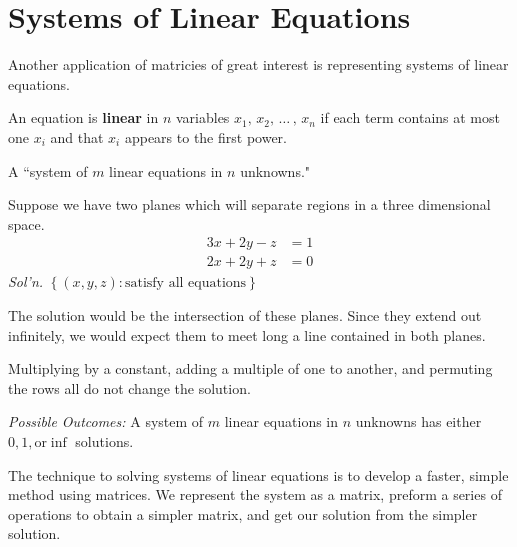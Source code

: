 \documentclass[../main.tex]{subfiles}
\begin{document}

\section{Systems of Linear Equations}

Another application of matricies of great interest is representing systems of linear equations.

\begin{definition}
    An equation is \textbf{linear} in \( n \) variables \( x_1, \, x_2, \,  \dots \, ,\,  x_n \)
    if each term contains at most one \( x_i \) and that \( x_i \) appears to the first power.
\end{definition}

A ``system of \( m \) linear equations in \( n \) unknowns."

\begin{example}
    Suppose we have two planes which will separate regions in a three dimensional space.
    \[ \begin{aligned}
        3x + 2y - z &= 1 \\
        2x + 2y + z & = 0
    \end{aligned} \]
    \textit{Sol'n.} \( \left\{ (x,y,z) : \text{satisfy all equations} \right\} \)
    
    The solution would be the intersection of these planes.
    Since they extend out infinitely, we would expect them to meet long a line contained in both planes.
\end{example}

\begin{note}
    Multiplying by a constant, adding a multiple of one to another, and permuting the rows all do not change the solution.
\end{note}

\emph{Possible Outcomes:} A system of \( m \) linear equations in \( n \) unknowns has either \( 0, 1, \text{or} \inf \) solutions.

The technique to solving systems of linear equations is to develop a faster, simple method using matrices.
We represent the system as a matrix, preform a series of operations to obtain a simpler matrix, and get our solution from the simpler solution.
\end{document}

